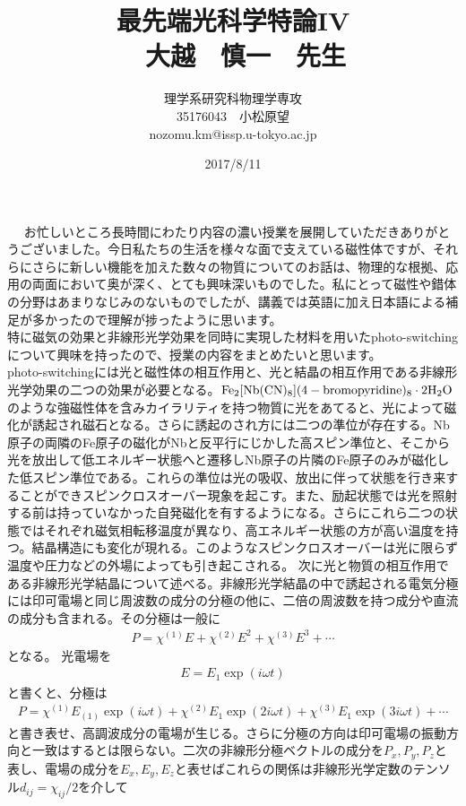 \documentclass{jsarticle}
\title{最先端光科学特論IV\\　大越　慎一　先生}
\author{理学系研究科物理学専攻\\35176043　小松原望\\nozomu.km@issp.u-tokyo.ac.jp}
\date{2017/8/11}
\begin{document}
\maketitle　%
お忙しいところ長時間にわたり内容の濃い授業を展開していただきありがとうございました。今日私たちの生活を様々な面で支えている磁性体ですが、それらにさらに新しい機能を加えた数々の物質についてのお話は、物理的な根拠、応用の両面において奥が深く、とても興味深いものでした。私にとって磁性や錯体の分野はあまりなじみのないものでしたが、講義では英語に加え日本語による補足が多かったので理解が捗ったように思います。\\
\quad 特に磁気の効果と非線形光学効果を同時に実現した材料を用いたphoto-switching について興味を持ったので、授業の内容をまとめたいと思います。\\
\quad photo-switchingには光と磁性体の相互作用と、光と結晶の相互作用である非線形光学効果の二つの効果が必要となる。$\rm{Fe_2[Nb(CN)_8](4-bromopyridine)_8\cdot2H_2O}$のような強磁性体を含みカイラリティを持つ物質に光をあてると、光によって磁化が誘起され磁石となる。さらに誘起のされ方には二つの準位が存在する。Nb原子の両隣のFe原子の磁化がNbと反平行にじかした高スピン準位と、そこから光を放出して低エネルギー状態へと遷移しNb原子の片隣のFe原子のみが磁化した低スピン準位である。これらの準位は光の吸収、放出に伴って状態を行き来することができスピンクロスオーバー現象を起こす。また、励起状態では光を照射する前は持っていなかった自発磁化を有するようになる。さらにこれら二つの状態ではそれぞれ磁気相転移温度が異なり、高エネルギー状態の方が高い温度を持つ。結晶構造にも変化が現れる。このようなスピンクロスオーバーは光に限らず温度や圧力などの外場によっても引き起こされる。
\quad 次に光と物質の相互作用である非線形光学結晶について述べる。非線形光学結晶の中で誘起される電気分極には印可電場と同じ周波数の成分の分極の他に、二倍の周波数を持つ成分や直流の成分も含まれる。その分極は一般に
\begin{eqnarray}
P=\chi^{(1)}E+\chi^{(2)}E^2+\chi^{(3)}E^3+\cdots
\end{eqnarray}
となる。
光電場を
\begin{eqnarray}
E=E_1\exp{(i\omega t)}
\end{eqnarray}
と書くと、分極は
\begin{eqnarray}
P=\chi^{(1)}E_{(1)}\exp{(i\omega t)}+\chi^{(2)}E_1\exp{(2i\omega t)}+\chi^{(3)}E_1\exp{(3i\omega t)}+\cdots
\end{eqnarray}
と書き表せ、高調波成分の電場が生じる。さらに分極の方向は印可電場の振動方向と一致はするとは限らない。二次の非線形分極ベクトルの成分を$P_x,P_y,P_z$と表し、電場の成分を$E_x,E_y,E_z$と表せばこれらの関係は非線形光学定数のテンソル$d_{ij}=\chi_{ij}/2$を介して
\end{document}
